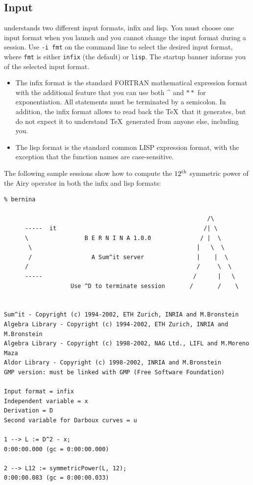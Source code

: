 \subsection{Input}
\bernina{} understands two different input formats, infix and lisp.
You must choose one input format when you launch \bernina{} and you
cannot change the input format during a session.
Use {\tt -i fmt} on the command line
to select the desired input format, where {\tt fmt}
is either {\tt infix} (the default) or {\tt lisp}. The startup banner
informs you of the selected input format.
\begin{itemize}
\item
The infix format is the standard FORTRAN mathematical expression format
with the additional feature that you can use both \^{} and $\ast\ast$ for
exponentiation. All statements must be terminated by a semicolon.
In addition, the infix format allows \bernina{} to read back
the \TeX~that it generates, but do not expect it to understand \TeX~generated
from anyone else, including you.
\item
The lisp format is the standard common LISP
expression format, with the exception that the \bernina{} function names
are case-sensitive.
\end{itemize}
The following sample sessions show how to compute
the ${12}^{{\rm th}}$ symmetric power of the Airy operator in both the infix and
lisp formats:
\begin{verbatim}
% bernina

                                                          /\    
      -----  it                                          /| \    
      \                B E R N I N A 1.0.0              / |  \    
       \                                               |   \  \   
       /                 A Sum^it server               |    |  \  
      /                                                /     \  \ 
      -----                                           /      |   \
                   Use ^D to terminate session       /       /    \


Sum^it - Copyright (c) 1994-2002, ETH Zurich, INRIA and M.Bronstein
Algebra Library - Copyright (c) 1994-2002, ETH Zurich, INRIA and M.Bronstein
Algebra Library - Copyright (c) 1998-2002, NAG Ltd., LIFL and M.Moreno Maza
Aldor Library - Copyright (c) 1998-2002, INRIA and M.Bronstein
GMP version: must be linked with GMP (Free Software Foundation)

Input format = infix
Independent variable = x
Derivation = D
Second variable for Darboux curves = u

1 --> L := D^2 - x;
0:00:00.000 (gc = 0:00:00.000)

2 --> L12 := symmetricPower(L, 12);
0:00:00.083 (gc = 0:00:00.033)
\end{verbatim}
